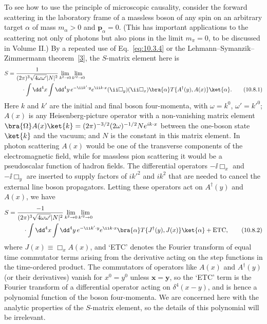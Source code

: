 To see how to use the principle of microscopic causality, consider the
forward scattering in the laboratory frame of a massless boson of any spin on
an arbitrary target $\alpha$ of mass $m_\alpha>0$ and $\mathbf p_\alpha=0$.
(This has important applications to the scattering not only of photons but
also pions in the limit $m_\pi=0$, to be discussed in Volume II.) By a repeated
use of Eq.~\eqref{eq:10.3.4} or the Lehmann--Symanzik--Zimmermann
theorem~\hyperref[ref:10.3]{[3]}, the $S$-matrix element here is
\begin{align}
  S={}&\frac{1}{(2\pi)^3\sqrt{4\omega\omega'}|N|^2}
  \lim_{k^2\to0}\lim_{k'^2\to0}\notag\\
  &\quad\cdot\int \dd^4x\int \dd^4y\,e^{-\ii k'\cdot y}e^{\ii k\cdot x}
  (\ii\Box_y)(\ii\Box_x)
  \bra{\alpha}T\{A^\dagger(y),A(x)\}\ket{\alpha}.
  \tag{10.8.1}\label{eq:10.8.1}
\end{align}
Here $k$ and $k'$ are the initial and final boson four-momenta, with
$\omega=k^0$, $\omega'=k'^0$; $A(x)$ is any Heisenberg-picture operator
with a non-vanishing matrix element
$\bra{\Omega}A(x)\ket{k}=(2\pi)^{-3/2}(2\omega)^{-1/2}Ne^{ik\cdot x}$
between the one-boson state $\ket{k}$ and the vacuum; and $N$ is the
constant in this matrix element. In photon scattering $A(x)$ would be one
of the transverse components of the electromagnetic field, while for massless
pion scattering it would be a pseudoscalar function of hadron fields. The
differential operators $-\ii\Box_x$ and $-\ii\Box_y$ are inserted to supply
factors of $ik'^2$ and $ik^2$ that are needed to cancel the external line
boson propagators. Letting these operators act on $A^\dagger(y)$ and $A(x)$,
we have
\begin{align}
  S={}&\frac{-1}{(2\pi)^3\sqrt{4\omega\omega'}|N|^2}
  \lim_{k^2\to0}\lim_{k'^2\to0}\notag\\
  &\quad\cdot\int \dd^4x\int \dd^4y\,e^{-\ii k'\cdot y}e^{\ii k\cdot x}
  \bra{\alpha}T\{J^\dagger(y),J(x)\}\ket{\alpha}+\mathrm{ETC},
  \tag{10.8.2}\label{eq:10.8.2}
\end{align}
where $J(x)\equiv\Box_xA(x)$, and `ETC' denotes the Fourier transform
of equal time commutator terms arising from the derivative acting on the
step functions in the time-ordered product. The commutators of operators
like $A(x)$ and $A^\dagger(y)$ (or their derivatives) vanish for $x^0=y^0$
unless $\mathbf{x}=\mathbf{y}$, so the `ETC' term is the Fourier transform
of a differential operator acting on $\delta^4(x-y)$, and is hence a
polynomial function of the boson four-momenta. We are concerned here with
the analytic properties of the $S$-matrix element, so the details of this
polynomial will be irrelevant.

